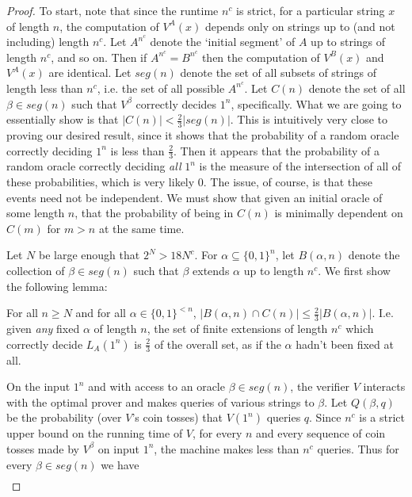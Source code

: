 \documentclass{article}
\theoremstyle{definition}
\theoremstyle{plain}
\theoremstyle{theorem}
\begin{document}
\begin{proof}
	To start, note that since the runtime $n^c$ is strict, for a particular string $x$ of length $n$, the computation of $V^A(x)$ depends only on strings up to (and not including) length $n^c$. Let $A^{n^c}$ denote the `initial segment' of $A$ up to strings of length $n^c$, and so on. Then if $A^{n^c} = B^{n^c}$ then the computation of $V^B(x)$ and $V^A(x)$ are identical. Let $seg(n)$ denote the set of all subsets of strings of length less than $n^c$, i.e. the set of all possible $A^{n^c}$. Let $C(n)$ denote the set of all $\beta \in seg(n)$ such that $V^{\beta}$ correctly decides $1^n$, specifically. What we are going to essentially show is that $|C(n)| < \frac{2}{3}|seg(n)|$. This is intuitively very close to proving our desired result, since it shows that the probability of a random oracle correctly deciding $1^n$ is less than $\frac{2}{3}$. Then it appears that the probability of a random oracle correctly deciding \emph{all} $1^n$ is the measure of the intersection of all of these probabilities, which is very likely $0$. The issue, of course, is that these events need not be independent. We must show that given an initial oracle of some length $n$, that the probability of being in $C(n)$ is minimally dependent on $C(m)$ for $m > n$ at the same time. \par 
	Let $N$ be large enough that $2^N > 18N^c$. For $\alpha \subseteq \{0,1\}^n$, let $B(\alpha,n)$ denote the collection of $\beta \in seg(n)$ such that $\beta$ extends $\alpha$ up to length $n^c$. We first show the following lemma: \par 
	\vspace{10mm}
	For all $n \geq N$ and for all $\alpha \in \{0,1\}^{<n}$, $|B(\alpha,n)\cap C(n)| \leq \frac{2}{3}|B(\alpha,n)|$. I.e. given \emph{any} fixed $\alpha$ of length $n$, the set of finite extensions of length $n^c$ which correctly decide $L_A(1^n)$ is $\frac{2}{3}$ of the overall set, as if the $\alpha$ hadn't been fixed at all. \vspace{10mm}
	\par On the input $1^n$ and with access to an oracle $\beta \in seg(n)$, the verifier $V$ interacts with the optimal prover and makes queries of various strings to $\beta$. Let $Q(\beta,q)$ be the probability  (over $V$'s coin tosses) that $V(1^n)$ queries $q$. Since $n^c$ is a strict upper bound on the running time of $V$, for every $n$ and every sequence of coin tosses made by $V^{\beta}$ on input $1^n$, the machine makes less than $n^c$ queries. Thus for every $\beta \in seg(n)$ we have
	\begin{align}

\end{align}
\end{proof}
\end{document}
